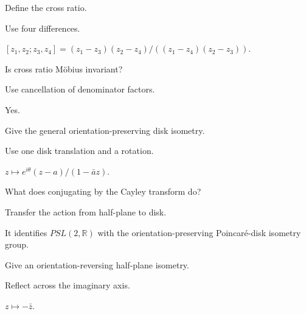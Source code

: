 \begin{exercise}\label{exr:vii33-18}
Define the cross ratio.
\end{exercise}
\begin{hint}
Use four differences.
\end{hint}
\begin{solution}
\([z_1,z_2;z_3,z_4]=(z_1-z_3)(z_2-z_4)/((z_1-z_4)(z_2-z_3))\).
\end{solution}

\begin{exercise}\label{exr:vii33-19}
Is cross ratio Möbius invariant?
\end{exercise}
\begin{hint}
Use cancellation of denominator factors.
\end{hint}
\begin{solution}
Yes.
\end{solution}

\begin{exercise}\label{exr:vii33-20}
Give the general orientation-preserving disk isometry.
\end{exercise}
\begin{hint}
Use one disk translation and a rotation.
\end{hint}
\begin{solution}
\(z\mapsto e^{i\theta}(z-a)/(1-\bar a z)\).
\end{solution}

\begin{exercise}\label{exr:vii33-21}
What does conjugating by the Cayley transform do?
\end{exercise}
\begin{hint}
Transfer the action from half-plane to disk.
\end{hint}
\begin{solution}
It identifies \(PSL(2,\mathbb R)\) with the orientation-preserving Poincaré-disk isometry group.
\end{solution}

\begin{exercise}\label{exr:vii33-22}
Give an orientation-reversing half-plane isometry.
\end{exercise}
\begin{hint}
Reflect across the imaginary axis.
\end{hint}
\begin{solution}
\(z\mapsto-\bar z\).
\end{solution}


